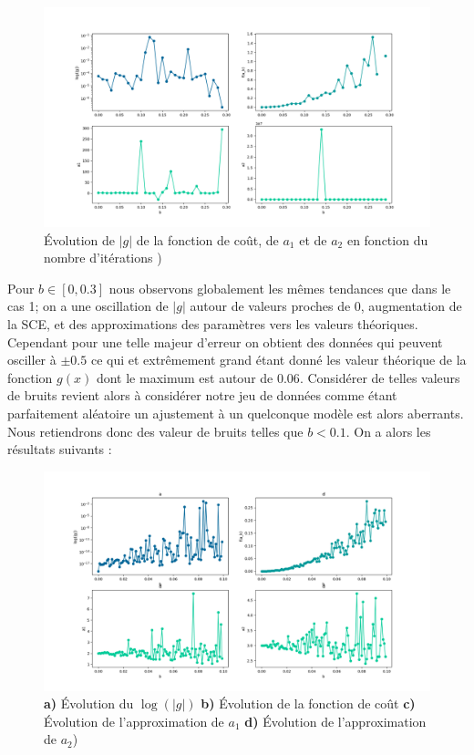 \documentclass[12pt]{article}
\begin{document}
  
  \begin{figure}[H]
\centering
\includegraphics[width=1\textwidth]{Q17.png}
\caption{Évolution de $|g|$ de la fonction de coût, de $a_1$ et de $a_2$ en fonction du nombre d'itérations  )}
\label{FigQ12}
\end{figure}
Pour $b\in [0,0.3]$ nous observons globalement les mêmes tendances que dans le cas 1; on a une oscillation de $|g|$ autour de valeurs proches de 0, augmentation de la SCE, et des approximations des paramètres vers les valeurs théoriques. Cependant pour une telle majeur d'erreur on obtient des données qui peuvent osciller à $\pm 0.5$ ce qui et extrêmement grand étant donné les valeur théorique de la fonction $g(x)$ dont le maximum est autour de $0.06$. Considérer de telles valeurs de bruits revient alors à considérer notre jeu de données comme étant parfaitement aléatoire un ajustement à un quelconque modèle est alors aberrants.\\
Nous retiendrons donc des valeur de bruits telles que $b<0.1$. On a alors les résultats suivants : 

  \begin{figure}[H]
\centering
\includegraphics[width=1\textwidth]{Q17FFFF.png}
\caption{\textbf{a)} Évolution du $\log(|g|)$ \textbf{b)} Évolution de la fonction de coût \textbf{c)} Évolution de l'approximation de $a_1$  \textbf{d)} Évolution de l'approximation de $a_2$)}
\label{FigQ12}
\end{figure}
\end{document}
